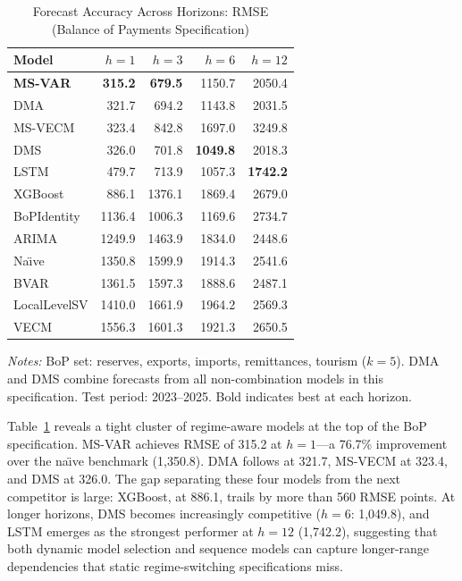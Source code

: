 \documentclass[12pt,a4paper]{article}
\begin{document}
\begin{table}[htbp]
\centering
\caption{Forecast Accuracy Across Horizons: RMSE (Balance of Payments Specification)}
\label{tab:bop_horizon}
\begin{tabular}{lrrrr}
\toprule
Model & $h = 1$ & $h = 3$ & $h = 6$ & $h = 12$ \\
\midrule
\textbf{MS-VAR} & \textbf{315.2} & \textbf{679.5} & 1150.7 & 2050.4 \\
DMA & 321.7 & 694.2 & 1143.8 & 2031.5 \\
MS-VECM & 323.4 & 842.8 & 1697.0 & 3249.8 \\
DMS & 326.0 & 701.8 & \textbf{1049.8} & 2018.3 \\
LSTM & 479.7 & 713.9 & 1057.3 & \textbf{1742.2} \\
XGBoost & 886.1 & 1376.1 & 1869.4 & 2679.0 \\
BoPIdentity & 1136.4 & 1006.3 & 1169.6 & 2734.7 \\
ARIMA & 1249.9 & 1463.9 & 1834.0 & 2448.6 \\
Na\"{\i}ve & 1350.8 & 1599.9 & 1914.3 & 2541.6 \\
BVAR & 1361.5 & 1597.3 & 1888.6 & 2487.1 \\
LocalLevelSV & 1410.0 & 1661.9 & 1964.2 & 2569.3 \\
VECM & 1556.3 & 1601.3 & 1921.3 & 2650.5 \\
\bottomrule
\end{tabular}
\begin{tablenotes}
\small
\item \textit{Notes:} BoP set: reserves, exports, imports, remittances, tourism ($k=5$). DMA and DMS combine forecasts from all non-combination models in this specification. Test period: 2023--2025. Bold indicates best at each horizon.
\end{tablenotes}
\end{table}

Table~\ref{tab:bop_horizon} reveals a tight cluster of regime-aware models at the top of the BoP specification. MS-VAR achieves RMSE of 315.2 at $h=1$---a 76.7\% improvement over the na\"{\i}ve benchmark (1,350.8). DMA follows at 321.7, MS-VECM at 323.4, and DMS at 326.0. The gap separating these four models from the next competitor is large: XGBoost, at 886.1, trails by more than 560 RMSE points. At longer horizons, DMS becomes increasingly competitive ($h=6$: 1,049.8), and LSTM emerges as the strongest performer at $h=12$ (1,742.2), suggesting that both dynamic model selection and sequence models can capture longer-range dependencies that static regime-switching specifications miss.
\end{document}
